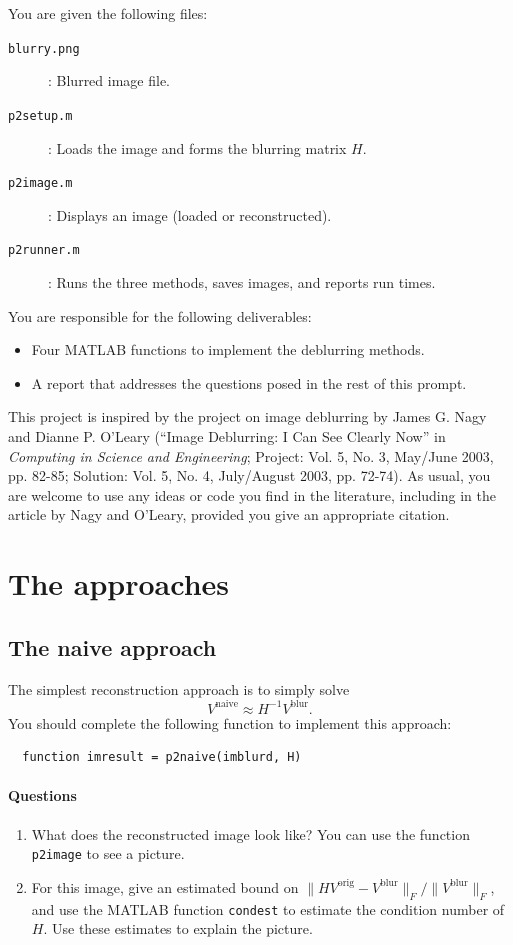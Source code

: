 \documentclass[12pt, leqno]{article} %
\begin{document}
You are given the following files:
\begin{description}
\item[{\tt blurry.png}]: Blurred image file.
\item[{\tt p2setup.m}]: Loads the image and forms the blurring matrix $H$.
\item[{\tt p2image.m}]: Displays an image (loaded or reconstructed).
\item[{\tt p2runner.m}]: Runs the three methods, saves images, and reports run times.
\end{description}
You are responsible for the following deliverables:
\begin{itemize}
\item Four MATLAB functions to implement the deblurring methods.
\item A report that addresses the questions posed in the rest of this prompt.
\end{itemize}
This project is inspired by the project on image deblurring by James
G. Nagy and Dianne P. O'Leary (``Image Deblurring: I Can See Clearly
Now'' in {\em Computing in Science and Engineering}; Project: Vol. 5,
No. 3, May/June 2003, pp. 82-85; Solution: Vol. 5, No. 4, July/August
2003, pp. 72-74).  As usual, you are welcome to use any ideas or code
you find in the literature, including in the article by Nagy and
O'Leary, provided you give an appropriate citation.


\section{The approaches}

\subsection{The naive approach}

The simplest reconstruction approach is to simply solve
\[
  V^{\mathrm{naive}} \approx H^{-1} V^{\mathrm{blur}}.
\]
You should complete the following function to implement this approach:
\begin{lstlisting}
  function imresult = p2naive(imblurd, H)
\end{lstlisting}

\paragraph*{Questions}
\begin{enumerate}
\item
  What does the reconstructed image look like?  You can use the
  function {\tt p2image} to see a picture.
\item
  For this image, give an estimated bound on
  $\|HV^{\mathrm{orig}}-V^{\mathrm{blur}}\|_F/\|V^{\mathrm{blur}}\|_F$,
  and use the MATLAB function {\tt condest} to estimate the condition
  number of $H$.  Use these estimates to explain the picture.
\end{enumerate}
\end{document}
